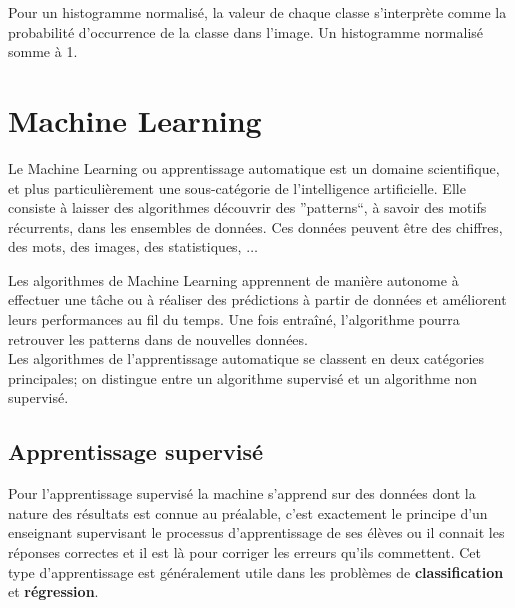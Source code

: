 \documentclass[a4paper,12pt]{report}
\begin{document}
Pour un histogramme normalisé, la valeur de chaque classe s'interprète comme la probabilité d'occurrence de la classe dans l'image. Un histogramme normalisé somme à 1.

\section{Machine Learning}

Le Machine Learning ou apprentissage automatique est un domaine scientifique, et plus particulièrement une sous-catégorie de l’intelligence artificielle. Elle consiste à laisser des algorithmes découvrir des ”patterns“, à savoir des motifs récurrents, dans les ensembles de données. Ces données peuvent être des chiffres, des mots, des images, des statistiques, $\ldots$ 

Les algorithmes de Machine Learning apprennent de manière autonome à effectuer une tâche ou à réaliser des prédictions à partir de données et améliorent leurs performances au fil du temps. Une fois entraîné, l’algorithme pourra retrouver les patterns dans de nouvelles données.\\

Les algorithmes de l'apprentissage automatique se classent en deux catégories principales; on distingue entre un algorithme supervisé et un algorithme non supervisé. 


\subsection{Apprentissage supervisé} 
Pour l'apprentissage supervisé la machine s'apprend sur des données dont la nature des résultats est connue au préalable, c'est exactement le principe d'un enseignant supervisant le processus d'apprentissage de ses élèves ou il connait les réponses correctes et il est là pour corriger les erreurs qu'ils commettent. Cet type d'apprentissage est généralement utile dans les problèmes de \textbf{classification} et \textbf{régression}. 

\end{document}
